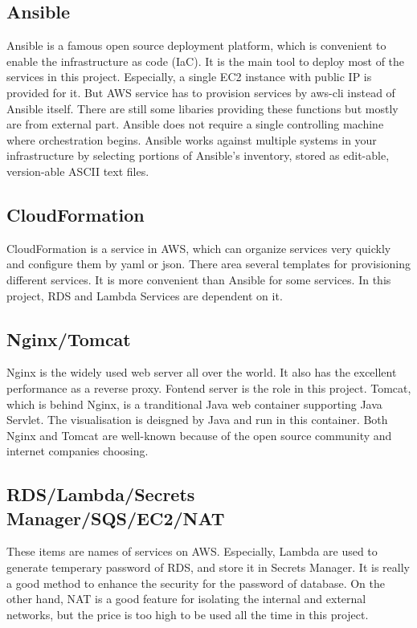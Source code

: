 \documentclass[conference]{IEEEtran}
\begin{document}
\subsection{Ansible}

Ansible is a famous open source deployment platform, which is convenient to enable the infrastructure as code (IaC). 
It is the main tool to deploy most of the services in this project. Especially, a single EC2 instance with public 
IP is provided for it. But AWS service has to provision services by aws-cli instead of Ansible itself. There are still 
some libaries providing these functions but mostly are from external part. Ansible does not require
a single controlling machine where orchestration begins. Ansible works against multiple systems in your infrastructure
by selecting portions of Ansible's inventory, stored as edit-able, version-able ASCII text files.

\subsection{CloudFormation}

CloudFormation is a service in AWS, which can organize services very quickly and configure them by yaml or json. There area
several templates for provisioning different services. It is more convenient than Ansible for some services. In this project, 
RDS and Lambda Services are dependent on it.

\subsection{Nginx/Tomcat}

Nginx is the widely used web server all over the world. It also has the excellent performance as a reverse proxy. 
Fontend server is the role in this project. Tomcat, which is behind Nginx, is a tranditional Java web container supporting 
Java Servlet. The visualisation is deisgned by Java and run in this container. Both Nginx and Tomcat are well-known because of 
the open source community and internet companies choosing.

\subsection{RDS/Lambda/Secrets Manager/SQS/EC2/NAT}

These items are names of services on AWS. Especially, Lambda are used to generate temperary password of RDS, and store it in 
Secrets Manager. It is really a good method to enhance the security for the password of database. On the other hand, NAT is a 
good feature for isolating the internal and external networks, but the price is too high to be used all the time in this project.
\end{document}
